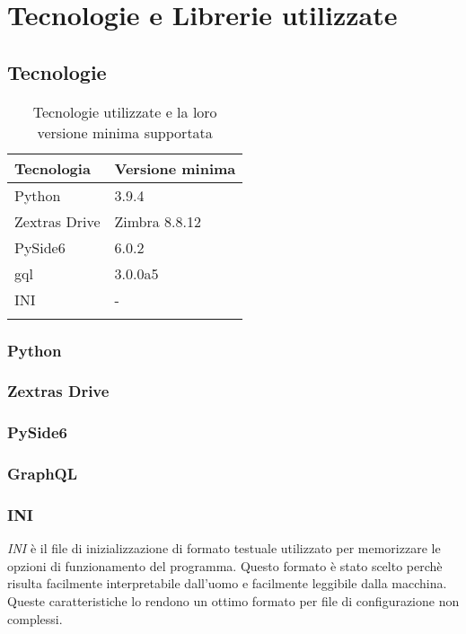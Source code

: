 \section{Tecnologie e Librerie utilizzate}

\subsection{Tecnologie}
{
	\setlength{\freewidth}{\dimexpr\textwidth-1\tabcolsep}
	\renewcommand{\arraystretch}{1.5}
	\setlength{\aboverulesep}{0pt}
	\setlength{\belowrulesep}{0pt}
	\begin{longtable}{L{.210\freewidth} L{.68\freewidth}}
		\textbf{Tecnologia} & \textbf{Versione minima} \\
		\toprule
		\endhead	
		Python & 3.9.4 \\
		Zextras Drive & Zimbra 8.8.12 \\	
		PySide6 & 6.0.2 \\
		gql&3.0.0a5 \\
		INI & - \\
		\bottomrule
		\hiderowcolors
		\caption{Tecnologie utilizzate e la loro versione minima supportata}
	\end{longtable}
\subsubsection{Python}

\subsubsection{Zextras Drive}

\subsubsection{PySide6}

\subsubsection{GraphQL}

\subsubsection{INI}
\textit{INI} è il file di inizializzazione di formato testuale utilizzato per memorizzare le opzioni di funzionamento del programma. Questo formato è stato scelto perchè risulta facilmente interpretabile dall'uomo e facilmente leggibile dalla macchina. Queste caratteristiche lo rendono un ottimo formato per file di configurazione non complessi.

}
